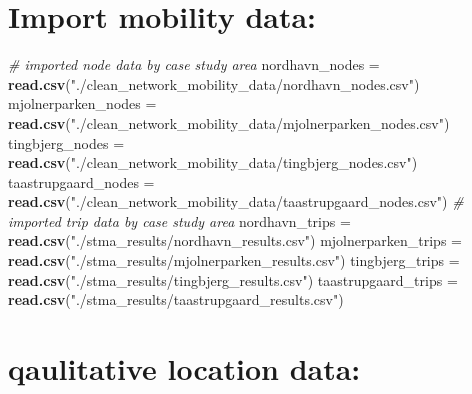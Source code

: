 \documentclass[
]{article}
\newenvironment{Shaded}{\begin{snugshade}}{\end{snugshade}}
\newcommand{\CommentTok}[1]{\textcolor[rgb]{0.56,0.35,0.01}{\textit{#1}}}
\newcommand{\FunctionTok}[1]{\textcolor[rgb]{0.13,0.29,0.53}{\textbf{#1}}}
\newcommand{\NormalTok}[1]{#1}
\newcommand{\OtherTok}[1]{\textcolor[rgb]{0.56,0.35,0.01}{#1}}
\newcommand{\StringTok}[1]{\textcolor[rgb]{0.31,0.60,0.02}{#1}}
\begin{document}
\section{Import mobility data:}\label{import-mobility-data}

\begin{Shaded}
\begin{Highlighting}[]
\CommentTok{\# imported node data by case study area }
\NormalTok{nordhavn\_nodes }\OtherTok{=} \FunctionTok{read.csv}\NormalTok{(}\StringTok{"./clean\_network\_mobility\_data/nordhavn\_nodes.csv"}\NormalTok{)}
\NormalTok{mjolnerparken\_nodes }\OtherTok{=} \FunctionTok{read.csv}\NormalTok{(}\StringTok{"./clean\_network\_mobility\_data/mjolnerparken\_nodes.csv"}\NormalTok{)}
\NormalTok{tingbjerg\_nodes }\OtherTok{=} \FunctionTok{read.csv}\NormalTok{(}\StringTok{"./clean\_network\_mobility\_data/tingbjerg\_nodes.csv"}\NormalTok{)}
\NormalTok{taastrupgaard\_nodes }\OtherTok{=} \FunctionTok{read.csv}\NormalTok{(}\StringTok{"./clean\_network\_mobility\_data/taastrupgaard\_nodes.csv"}\NormalTok{)}
\CommentTok{\# imported trip data by case study area }
\NormalTok{nordhavn\_trips }\OtherTok{=} \FunctionTok{read.csv}\NormalTok{(}\StringTok{"./stma\_results/nordhavn\_results.csv"}\NormalTok{)}
\NormalTok{mjolnerparken\_trips }\OtherTok{=} \FunctionTok{read.csv}\NormalTok{(}\StringTok{"./stma\_results/mjolnerparken\_results.csv"}\NormalTok{)}
\NormalTok{tingbjerg\_trips }\OtherTok{=} \FunctionTok{read.csv}\NormalTok{(}\StringTok{"./stma\_results/tingbjerg\_results.csv"}\NormalTok{)}
\NormalTok{taastrupgaard\_trips }\OtherTok{=} \FunctionTok{read.csv}\NormalTok{(}\StringTok{"./stma\_results/taastrupgaard\_results.csv"}\NormalTok{)}
\end{Highlighting}
\end{Shaded}

\section{qaulitative location data:}\label{qaulitative-location-data}
\end{document}
